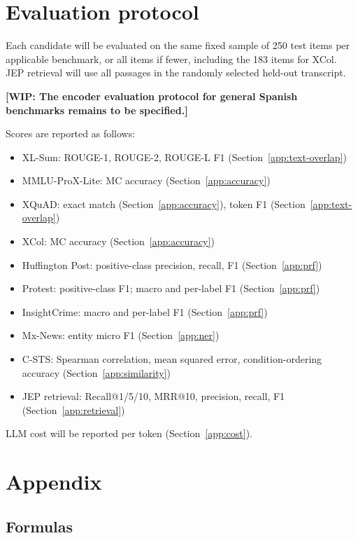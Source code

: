 \documentclass{article}
\begin{document}
\section{Evaluation protocol}
Each candidate will be evaluated on the same fixed sample of 250 test items per applicable benchmark, or all items if fewer, including the 183 items for XCol. JEP retrieval will use all passages in the randomly selected held-out transcript.

\noindent\textbf{[WIP: The encoder evaluation protocol for general Spanish benchmarks remains to be specified.]}\par\smallskip

Scores are reported as follows:
\begin{itemize}
    \item XL-Sum: ROUGE-1, ROUGE-2, ROUGE-L F1 (Section~\ref{app:text-overlap})~\cite{XL-SUM,ROUGE}
    \item MMLU-ProX-Lite: MC accuracy (Section~\ref{app:accuracy})~\cite{MMLU-ProX-Lite}
    \item XQuAD: exact match (Section~\ref{app:accuracy}), token F1 (Section~\ref{app:text-overlap})~\cite{XQuad}
    \item XCol: MC accuracy (Section~\ref{app:accuracy})~\cite{XCol}
    \item Huffington Post: positive-class precision, recall, F1 (Section~\ref{app:prf})~\cite{ConfliBERT-Spanish}
    \item Protest: positive-class F1; macro and per-label F1 (Section~\ref{app:prf})~\cite{ConfliBERT-Spanish}
    \item InsightCrime: macro and per-label F1 (Section~\ref{app:prf})~\cite{ConfliBERT-Spanish,Parolin2021}
    \item Mx-News: entity micro F1 (Section~\ref{app:ner})~\cite{MxNews,CoNLL2003}
    \item C-STS: Spearman correlation, mean squared error, condition-ordering accuracy (Section~\ref{app:similarity})~\cite{C-STSCleaned}
    \item JEP retrieval: Recall@1/5/10, MRR@10, precision, recall, F1 (Section~\ref{app:retrieval})~\cite{IRMeasures}
\end{itemize}

LLM cost will be reported per token (Section~\ref{app:cost}).

\section{Appendix}
\subsection{Formulas}
\label{app:formulas}
\end{document}

